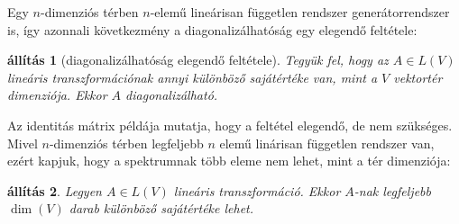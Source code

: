 \documentclass[a4paper, showtrims]{memoir}
\theoremstyle{plain}
\newtheorem{proposition}{állítás}[chapter]
\theoremstyle{remark}
\theoremstyle{definition}
\begin{document}
Egy $n$-dimenziós térben $n$-elemű lineárisan független rendszer generátorrendszer is, így
azonnali következmény a diagonalizálhatóság egy elegendő feltétele:
\begin{proposition}[diagonalizálhatóság elegendő feltétele]
	Tegyük fel, hogy az $A\in L\left( V \right)$ lineáris transzformációnak annyi különböző sajátértéke van,
	mint a $V$ vektortér dimenziója.
	Ekkor $A$ diagonalizálható.
\end{proposition}
Az identitás mátrix példája mutatja, hogy a feltétel elegendő, de nem szükséges.
Mivel $n$-dimenziós térben legfeljebb $n$ elemű linárisan független rendszer van,
ezért kapjuk, hogy a spektrumnak több eleme nem lehet, mint a tér dimenziója:
\begin{proposition}
	Legyen $A\in L\left( V \right)$ lineáris transzformáció.
	Ekkor $A$-nak legfeljebb $\dim(V)$ darab különböző sajátértéke lehet.
\end{proposition}
\end{document}
